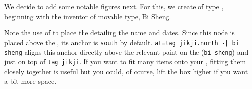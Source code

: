 \documentclass[10pt,british,a4paper]{ltxdoc}
\begin{document}
We decide to add some notable figures next.
For this, we create \elementslabelname{} of \taglabelname{} type , beginning with the inventor of movable type, Bi Sheng.
\begin{chronoscode}[at]
\end{chronoscode}
Note the use of  to place the  detailing the name and dates.
Since this node is placed above the , its anchor is \texttt{south} by default.
\verb+at=tag jikji.north -| bi sheng+ aligns this anchor directly above the relevant point on the  (\texttt{bi sheng}) and just on top of \texttt{tag jikji}.
If you want to fit many items onto your , fitting them closely together is useful but you could, of course, lift the box higher if you want a bit more space.
\end{document}
